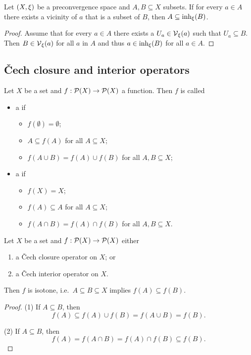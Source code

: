\begin{lemma} \label{subsetWithVicinitiesInInherence}
Let $\sSet{X,\xi}$ be a preconvergence space and $A,B\subseteq X$ subsets. If for every $a\in A$ there exists a vicinity of $a$ that is a subset of $B$, then $A\subseteq \operatorname{inh}_\xi(B)$.
\end{lemma}
\begin{proof}
Assume that for every $a\in A$ there exists a $U_a \in \operatorname{\mathcal{V}}_\xi(a)$ such that $U_a \subseteq B$. Then $B\in \operatorname{\mathcal{V}}_\xi(a)$ for all $a$ in $A$ and thus $a\in \operatorname{inh}_\xi(B)$ for all $a\in A$.
\end{proof}

\subsection{Čech closure and interior operators}
\begin{definition}
Let $X$ be a set and $f: \operatorname{\mathcal{P}}(X)\to \operatorname{\mathcal{P}}(X)$ a function. Then $f$ is called
\begin{itemize}
\item a  if
\begin{itemize}
\item $f(\emptyset) = \emptyset$;
\item $A\subseteq f(A)$ for all $A\subseteq X$;
\item $f(A \cup B) = f(A)\cup f(B)$ for all $A,B\subseteq X$;
\end{itemize}
\item a  if
\begin{itemize}
\item $f(X) = X$;
\item $f(A)\subseteq A$ for all $A\subseteq X$;
\item $f(A \cap B) = f(A)\cap f(B)$ for all $A,B\subseteq X$.
\end{itemize}
\end{itemize}
\end{definition}

\begin{lemma}
Let $X$ be a set and $f: \operatorname{\mathcal{P}}(X)\to \operatorname{\mathcal{P}}(X)$ either
\begin{enumerate}
\item a Čech closure operator on $X$; or
\item a Čech interior operator on $X$.
\end{enumerate}
Then $f$ is isotone, i.e.\ $A\subseteq B\subseteq X$ implies $f(A) \subseteq f(B)$.
\end{lemma}
\begin{proof}
(1) If $A\subseteq B$, then 
\[ f(A) \subseteq f(A)\cup f(B) = f(A\cup B) = f(B). \]

(2) If $A\subseteq B$, then 
\[ f(A) = f(A\cap B) = f(A)\cap f(B) \subseteq f(B). \]
\end{proof}

